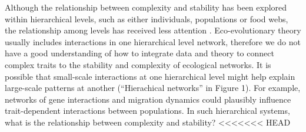 \documentclass[12pt]{article}
\begin{document}
Although the relationship between complexity and stability has been
explored within hierarchical levels, such as either individuals,
populations or food webs, the relationship among levels has received
less attention
\citep{Whithametal:2006,Loeuille:2010,Fontaineetal:2011}. Eco-evolutionary
theory usually includes interactions in one hierarchical level
network, therefore we do not have a good understanding of how to
integrate data and theory to connect complex traits to the stability
and complexity of ecological networks. It is possible that small-scale
interactions at one hierarchical level might help explain large-scale
patterns at another (``Hierachical networks'' in Figure 1). For
example, networks of gene interactions and migration dynamics could plausibly influence
trait-dependent interactions between populations. In such hierarchical
systems, what is the relationship between complexity and stability?
<<<<<<< HEAD
\end{document}
